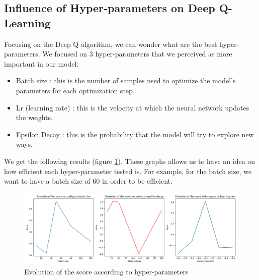 \documentclass[11pt,a4paper]{article}
\newcounter{fig}
\newcommand{\mlist}[1]{\begin{itemize}[noitemsep,topsep=0pt]#1\end{itemize}}
\begin{document}
        
		\subsection*{Influence of Hyper-parameters on Deep Q-Learning}
Focusing on the Deep Q algorithm, we can wonder what are the best hyper-parameters. We focused on $3$ hyper-parameters that we perceived as more important in our model:
\mlist{
\item Batch size : this is the number of samples used to optimize the model's parameters for each optimization step. 
\item Lr (learning rate) : this is the velocity at which the neural network updates the weights. 
\item Epsilon Decay : this is the probability that the model will try to explore new ways. 
}
We get the following results (figure \ref{figure:Evolution of score depending of hyper-parameter}). These graphs allows us to have an idea on how efficient each hyper-parameter tested is. For example, for the batch size, we want to have a batch size of $60$ in order to be efficient.
        \begin{figure}[ht]
            \centering
            \includegraphics[scale = 0.46]{comparaison2.png}
            \caption{Evolution of the score according to hyper-parameters}
            \label{figure:Evolution of score depending of hyper-parameter}
        \end{figure}
        
        
        
\end{document}

